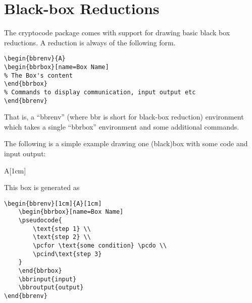 \documentclass[a4paper]{report}
\begin{document}
\chapter{Black-box Reductions}
\label{chap:bbr}

The cryptocode package comes with support for drawing basic black box reductions. A reduction is
always of the following form.

\begin{lstlisting}
\begin{bbrenv}{A}
\begin{bbrbox}[name=Box Name]
% The Box's content
\end{bbrbox}
% Commands to display communication, input output etc
\end{bbrenv}
\end{lstlisting}
That is, a \enquote{bbrenv} (where bbr is short for black-box reduction) environment which takes a single
\enquote{bbrbox} environment and some additional commands.

The following is a simple example drawing one (black)box with some code and input output:

\begin{bbrenv}[1cm]{A}[1cm]
	\begin{bbrbox}[name=Box Name]
	\end{bbrbox}
\end{bbrenv}

This box is generated as
\begin{lstlisting}
\begin{bbrenv}[1cm]{A}[1cm]
	\begin{bbrbox}[name=Box Name]
	\pseudocode{
		\text{step 1} \\
		\text{step 2} \\
		\pcfor \text{some condition} \pcdo \\
		\pcind\text{step 3}
	}
	\end{bbrbox}
	\bbrinput{input}
	\bbroutput{output}
\end{bbrenv}
\end{lstlisting}
\end{document}
